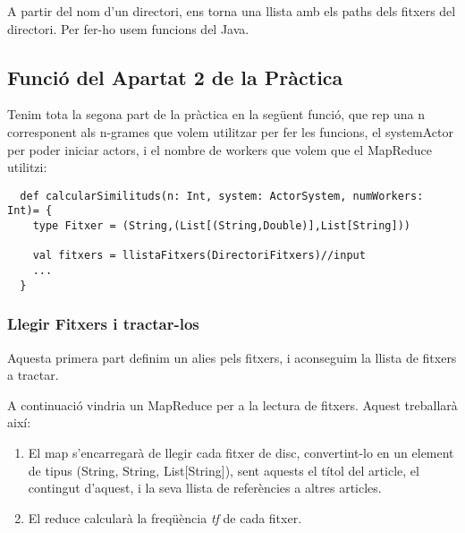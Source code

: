 \documentclass[11pt,a4paper,twoside]{report}
\begin{document}
A partir del nom d'un directori, ens torna una llista amb els paths dels fitxers del directori.
Per fer-ho usem funcions del Java.

\subsection{Funció del Apartat 2 de la Pràctica}

Tenim tota la segona part de la pràctica en la següent funció, que rep una n corresponent als n-grames que volem utilitzar per fer les funcions, el systemActor per poder iniciar actors, i el nombre de workers que volem que el MapReduce utilitzi:

\begin{lstlisting}
  def calcularSimilituds(n: Int, system: ActorSystem, numWorkers: Int)= {
    type Fitxer = (String,(List[(String,Double)],List[String]))

    val fitxers = llistaFitxers(DirectoriFitxers)//input
    ...
  }
\end{lstlisting}

\subsubsection{Llegir Fitxers i tractar-los}

Aquesta primera part definim un alies pels fitxers, i aconseguim la llista de fitxers a tractar.

A continuació vindria un MapReduce per a la lectura de fitxers. Aquest treballarà així:
\begin{enumerate}
  \item El map s'encarregarà de llegir cada fitxer de disc, convertint-lo en un element de tipus (String, String, List[String]), sent aquests el títol del article, el contingut d'aquest, i la seva llista de referències a altres articles.
  \item El reduce calcularà la freqüència \textit{tf} de cada fitxer.
\end{enumerate}
\end{document}
